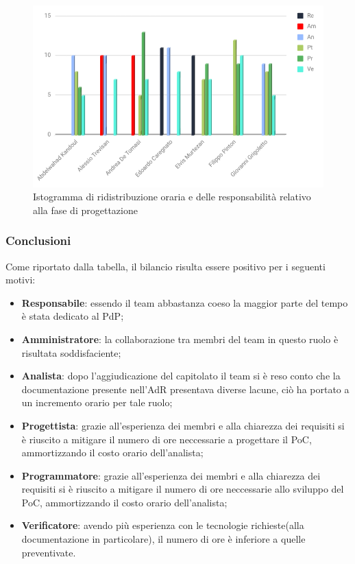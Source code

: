  \begin{figure}[h!]
	\caption{Istogramma di ridistribuzione oraria e delle responsabilità relativo alla fase di progettazione}
    \includegraphics[width=1\textwidth]{./src/Preventivo/src/img/istoConsuntivoProgettazioneRuoli.png}  
\end{figure} 


\subsubsection{Conclusioni}
Come riportato dalla tabella, il bilancio risulta essere positivo per i seguenti motivi:
\begin{itemize}
	\item \textbf{Responsabile}: {essendo il team abbastanza coeso la maggior parte del tempo è stata dedicato al PdP;}
	\item \textbf{Amministratore}: {la collaborazione tra membri del team in questo ruolo è risultata soddisfaciente;}
	\item \textbf{Analista}: {dopo l'aggiudicazione del capitolato il team si è reso conto che la documentazione presente nell'AdR presentava diverse lacune, ciò ha portato a un incremento orario per tale ruolo;}
	\item \textbf{Progettista}: {grazie all'esperienza dei membri e alla chiarezza dei requisiti si è riuscito a mitigare il numero di ore neccessarie a progettare il PoC, ammortizzando il costo orario dell'analista;}
	\item \textbf{Programmatore}: {grazie all'esperienza dei membri e alla chiarezza dei requisiti si è riuscito a mitigare il numero di ore neccessarie allo sviluppo del PoC, ammortizzando il costo orario dell'analista;}
	\item \textbf{Verificatore}: {avendo più esperienza con le tecnologie richieste(alla documentazione in particolare), il numero di ore è inferiore a quelle preventivate.}
\end{itemize}
